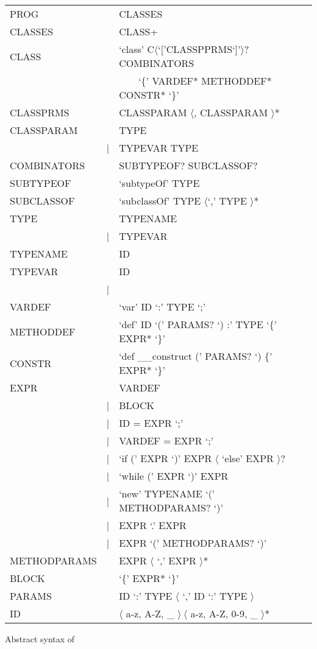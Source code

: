 \begin{listing}
	\begin{tabular}[H]{lrll}
		PROG & \lra & CLASSES \\
		CLASSES & \lra & CLASS+ \\
		CLASS & \lra & `class' C$\langle$`['CLASSPPRMS`]'$\rangle$? COMBINATORS \\
		& & ~~~~`\{' VARDEF* METHODDEF* CONSTR* `\}' \\
		CLASSPRMS & \lra & CLASSPARAM $\langle$, CLASSPARAM $\rangle$* \\
		CLASSPARAM & \lra & TYPE \\
		 & | & TYPEVAR \match TYPE \\
		COMBINATORS & \lra & SUBTYPEOF? SUBCLASSOF? \\
		SUBTYPEOF & \lra & `subtypeOf' TYPE \\
		SUBCLASSOF & \lra & `subclassOf' TYPE $\langle$`,' TYPE $\rangle$* \\
		TYPE & \lra & TYPENAME \\
		& | & TYPEVAR \\
		TYPENAME & \lra & ID \\
		TYPEVAR & \lra & ID \\
		& | & \mytype \\
		VARDEF & \lra & `var' ID `:' TYPE `;' \\
		METHODDEF & \lra & `def' ID `(' PARAMS? `) :' TYPE `\{' EXPR* `\}'  \\
		CONSTR & \lra & `def \_\_construct (' PARAMS? `) \{' EXPR* `\}' \\
		EXPR & \lra & VARDEF \\
		& | & BLOCK \\
		& | & ID = EXPR `;' \\
		& | & VARDEF = EXPR `;' \\
		& | & `if (' EXPR `)' EXPR $\langle$ `else' EXPR $\rangle$?  \\
		& | & `while (' EXPR `)' EXPR \\
		& | & `new' TYPENAME `(' METHODPARAMS? `)' \\
		& | & EXPR `.' EXPR \\
		& | & EXPR `(' METHODPARAMS? `)' \\
		METHODPARAMS & \lra & EXPR $\langle$ `,' EXPR $\rangle$* \\
		BLOCK & \lra & `\{' EXPR* `\}' \\
		PARAMS & \lra & ID `:' TYPE $\langle$ `,' ID `:' TYPE $\rangle$ \\
		ID & \lra & $\langle$ a-z, A-Z, \_ $\rangle~\langle$ a-z, A-Z, 0-9, \_ $\rangle$*
	\end{tabular}
	\caption{Abstract syntax of \ooplss}
	\label{lst:abstractSyntax}
\end{listing}

